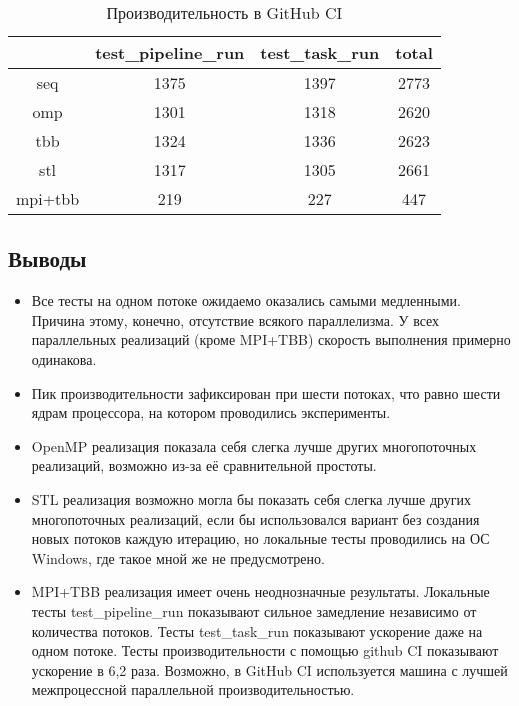 \documentclass[12pt,a4paper]{extarticle}
\begin{document}
\begin{table}[H]
\centering
\begin{tabular}{|c|c|c|c|}    
\hline
 & test\_pipeline\_run & test\_task\_run & total \\
 \hline
seq & 1375 & 1397 & 2773 \\
\hline
omp & 1301 & 1318 & 2620 \\
\hline
tbb & 1324 & 1336 & 2623 \\
\hline
stl & 1317 & 1305 & 2661 \\
\hline
mpi+tbb & 219 & 227 & 447 \\
\hline
\end{tabular}
\caption{Производительность в GitHub CI}
\end{table}

\subsection{Выводы}
\begin{itemize}
\item Все тесты на одном потоке ожидаемо оказались самыми медленными. Причина этому, конечно, отсутствие всякого параллелизма.
У всех параллельных реализаций (кроме MPI+TBB) скорость выполнения примерно одинакова.
\item Пик производительности зафиксирован при шести потоках, что равно шести ядрам процессора, на котором проводились эксперименты.
\item OpenMP реализация показала себя слегка лучше других многопоточных реализаций, возможно из-за её сравнительной простоты.
\item STL реализация возможно могла бы показать себя слегка лучше других многопоточных реализаций, если бы использовался вариант без создания новых потоков каждую итерацию, но локальные тесты проводились на ОС Windows, где такое мной же не предусмотрено.
\item MPI+TBB реализация имеет очень неоднозначные результаты. Локальные тесты test\_pipeline\_run показывают сильное замедление независимо от количества потоков. Тесты test\_task\_run показывают ускорение даже на одном потоке. Тесты производительности с помощью github CI показывают ускорение в 6,2 раза. Возможно, в GitHub CI используется машина с лучшей межпроцессной параллельной производительностью.
\end{itemize}

\newpage
\end{document}
